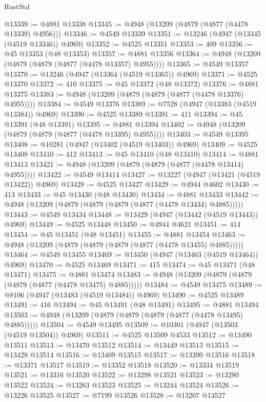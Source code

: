 \begin{lexlean}{RustStd}
\begin{coremodule}
@13339 := @4881 @13338
@13345 := @4948 (@13209 (@4879 (@4877 (@4478 @13339) @4956)))
@13346 := @4549 @13339
@13351 := @13246 (@4947 (@13345 (@4519 @13346)) @4969)
@13352 := @4525 @13351
@13353 := 409
@13356 := @45 @13353 (@48 @13353)
@13357 := @4881 @13356
@13364 := @4948 (@13209 (@4879 (@4879 (@4877 (@4478 @13357) @4955))))
@13365 := @4549 @13357
@13370 := @13246 (@4947 (@13364 (@4519 @13365)) @4969)
@13371 := @4525 @13370
@13372 := 410
@13375 := @45 @13372 (@48 @13372)
@13376 := @4881 @13375
@13383 := @4948 (@13209 (@4879 (@4879 (@4877 (@4478 @13376) @4955))))
@13384 := @4549 @13376
@13389 := @7528 (@4947 (@13383 (@4519 @13384)) @4969)
@13390 := @4525 @13389
@13391 := 411
@13394 := @45 @13391 (@48 @13391)
@13395 := @4881 @13394
@13402 := @4948 (@13209 (@4879 (@4879 (@4877 (@4478 @13395) @4955))))
@13403 := @4549 @13395
@13408 := @10281 (@4947 (@13402 (@4519 @13403)) @4969)
@13409 := @4525 @13408
@13410 := 412
@13413 := @45 @13410 (@48 @13410)
@13414 := @4881 @13413
@13421 := @4948 (@13209 (@4879 (@4879 (@4877 (@4478 @13414) @4955))))
@13422 := @4549 @13414
@13427 := @13227 (@4947 (@13421 (@4519 @13422)) @4969)
@13428 := @4525 @13427
@13429 := @4944 @4602
@13430 := 413
@13433 := @45 @13430 (@48 @13430)
@13434 := @4881 @13433
@13442 := @4948 (@13209 (@4879 (@4879 (@4879 (@4877 (@4478 @13434) @4885)))))
@13443 := @4549 @13434
@13448 := @13429 (@4947 (@13442 (@4519 @13443)) @4969)
@13449 := @4525 @13448
@13450 := @4944 @4621
@13451 := 414
@13454 := @45 @13451 (@48 @13451)
@13455 := @4881 @13454
@13463 := @4948 (@13209 (@4879 (@4879 (@4879 (@4877 (@4478 @13455) @4885)))))
@13464 := @4549 @13455
@13469 := @13450 (@4947 (@13463 (@4519 @13464)) @4969)
@13470 := @4525 @13469
@13471 := 415
@13474 := @45 @13471 (@48 @13471)
@13475 := @4881 @13474
@13483 := @4948 (@13209 (@4879 (@4879 (@4879 (@4877 (@4478 @13475) @4885)))))
@13484 := @4549 @13475
@13489 := @8106 (@4947 (@13483 (@4519 @13484)) @4969)
@13490 := @4525 @13489
@13491 := 416
@13494 := @45 @13491 (@48 @13491)
@13495 := @4881 @13494
@13503 := @4948 (@13209 (@4879 (@4879 (@4879 (@4877 (@4478 @13495) @4885)))))
@13504 := @4549 @13495
@13509 := @10301 (@4947 (@13503 (@4519 @13504)) @4969)
@13511 := @4525 @13509 @4533
@13512 := @13490 @13511
@13513 := @13470 @13512
@13514 := @13449 @13513
@13515 := @13428 @13514
@13516 := @13409 @13515
@13517 := @13390 @13516
@13518 := @13371 @13517
@13519 := @13352 @13518
@13520 := @13334 @13519
@13521 := @13316 @13520
@13522 := @13298 @13521
@13523 := @13280 @13522
@13524 := @13263 @13523
@13525 := @13244 @13524
@13526 := @13226 @13525
@13527 := @7199 @13526
@13528 := @13207 @13527

\end{coremodule}
\end{lexlean}
